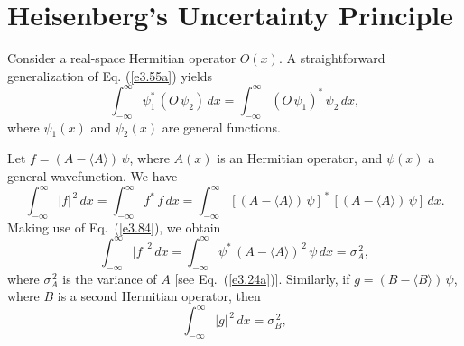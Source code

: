\section{Heisenberg's Uncertainty Principle}\label{suncert}
Consider a real-space Hermitian operator $O(x)$. A straightforward generalization of Eq. (\ref{e3.55a}) yields
\begin{equation}\label{e3.84}
\int_{-\infty}^\infty \psi_1^{\ast}\,(O\,\psi_2)\,dx = \int_{-\infty}^\infty
(O\,\psi_1)^\ast\,\psi_2\,dx,
\end{equation}
where $\psi_1(x)$ and $\psi_2(x)$ are general functions. 

Let $f=(A-\langle A\rangle)\,\psi$, where $A(x)$ is an Hermitian operator,
and $\psi(x)$ a general  wavefunction. We have
\begin{equation}
\int_{-\infty}^\infty |f|^{\,2}\,dx= \int_{-\infty}^\infty f^\ast\,f\,dx = \int_{-\infty}^\infty[(A-\langle A\rangle)\,\psi]^{\,\ast}\,[(A-\langle A\rangle)\,\psi]\,dx.
\end{equation}
Making use of Eq.~(\ref{e3.84}), we obtain
\begin{equation}\label{e3.86}
\int_{-\infty}^\infty |f|^{\,2}\,dx=\int_{-\infty}^\infty \psi^\ast\,(A-\langle A \rangle)^{\,2}\,\psi\,dx = \sigma_A^{\,2},
\end{equation}
where $\sigma_A^{\,2}$ is the variance of $A$ [see Eq.~(\ref{e3.24a})].
Similarly, if $g=(B-\langle B\rangle)\,\psi$, where $B$ is a second
Hermitian operator, then
 \begin{equation}
\int_{-\infty}^\infty |g|^{\,2}\,dx = \sigma_B^{\,2},
\end{equation}

